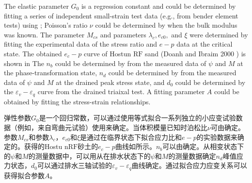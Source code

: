 \begin{ParaColumn}
    \CrossColumnText{
        
    }
    \switchcolumn*

    The elastic parameter $G_{0}$ is a regression constant and could be determined by fitting a series of independent small-strain test data (e.g., from bender element tests) using ; Poisson's ratio $\nu$ could be determined by  when the bulk modulus was known. The parameter $M_{c s}$ and parameters $\lambda_{c}, e_{c 0},$ and $\xi$ were determined by fitting the experimental data of the stress ratio and $e-p$ data at the critical state. The obtained $e_{c}-p$ curve of Hostun $\mathrm{RF}$ sand (Doanh and Ibraim 2000 ) is shown in  The $n_{b}$ could be determined by  from the measured data of $\psi$ and $M$ at the phase-transformation state, $n_{d}$ could be determined by  from the measured data of $\psi$ and $M$ at the drained peak stress state, and $d_{0}$ could be determined by the $\varepsilon_{v}-\varepsilon_{q}$ curve from the drained triaixal test. A fitting parameter $A$ could be obtained by fitting the stress-strain relationships.

    \switchcolumn

    弹性参数$G_{0}$是一个回归常数，可以通过使用等式拟合一系列独立的小应变试验数据（例如，来自弯曲元试验）使用来确定。当体积模量已知时泊松比$\nu$可由确定。参数$M_{cs}$和参数$\lambda_{c}$，$e_{c0}$和$\xi$是通过在临界状态下拟合应力比和$e-p$的实验数据来确定的。获得的Hostu n$\mathrm{RF}$砂土的$e_{c}-p$曲线\citep{Doanh2000}如所示。$n_{b}$可以由确定。从相变状态下的$\psi$和$M$的测量数据中，可以用从在排水状态下的$\psi$和$M$的测量数据确定$n_{d}$峰值应力状态，$d_{0}$可以通过排水三轴试验的$\varepsilon_{v}-\varepsilon_{q}$曲线确定。通过拟合应力应变关系可以获得拟合参数$A$。

    \switchcolumn*


\end{ParaColumn}

